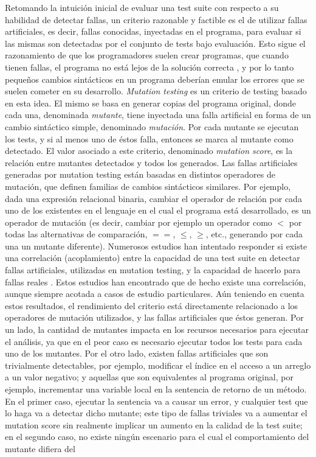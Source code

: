Retomando la intuici\'on inicial de evaluar una test suite con respecto a su habilidad de detectar fallas, un criterio razonable y factible es el de utilizar fallas artificiales, es decir, fallas conocidas, inyectadas en el programa, para evaluar si las mismas son detectadas por el conjunto de tests bajo evaluaci\'on. Esto sigue el razonamiento de que los programadores suelen crear programas, que cuando tienen fallas, el programa no est\'a lejos de la soluci\'on correcta \cite{bibliography.mutation.DeMillo}, y por lo tanto peque\~nos cambios sint\'acticos en un programa deber\'ian emular los errores que se suelen cometer en su desarrollo. \emph{Mutation testing} es un criterio de testing basado en esta idea. El mismo se basa en generar copias del programa original, donde cada una, denominada \emph{mutante}, tiene inyectada una falla artificial en forma de un cambio sint\'actico simple, denominado \emph{mutaci\'on}. Por cada mutante se ejecutan los tests, y si al menos uno de \'estos falla, entonces se marca al mutante como detectado. El valor asociado a este criterio, denominado \emph{mutation score}, es la relaci\'on entre mutantes detectados y todos los generados. Las fallas artificiales generadas por mutation testing est\'an basadas en distintos operadores de mutaci\'on, que definen familias de cambios sint\'acticos similares. Por ejemplo, dada una expresi\'on relacional binaria, cambiar el operador de relaci\'on por cada uno de los existentes en el lenguaje en el cual el programa est\'a desarrollado, es un operador de mutaci\'on (es decir, cambiar por ejemplo un operador como $<$ por todas las alternativas de comparaci\'on, $==$, $\le$, $\ge$, etc., generando por cada una un mutante diferente). Numerosos estudios han intentado responder si existe una correlaci\'on (acoplamiento) entre la capacidad de una test suite en detectar fallas artificiales, utilizadas en mutation testing, y la capacidad de hacerlo para fallas reales \cite{bibliography.mutation.evaluation.coupling.Offutt89, bibliography.mutation.evaluation.coupling.Offutt92, bibliography.mutation.evaluation.HAndrews05, bibliography.mutation.evaluation.valid-substitute}. Estos estudios han encontrado que de hecho existe una correlaci\'on, aunque siempre acotada a casos de estudio particulares. A\'un teniendo en cuenta estos resultados, el rendimiento del criterio est\'a directamente relacionado a los operadores de mutaci\'on utilizados, y las fallas artificiales que \'estos generan. Por un lado, la cantidad de mutantes impacta en los recursos necesarios para ejecutar el an\'alisis, ya que en el peor caso es necesario ejecutar todos los tests para cada uno de los mutantes. Por el otro lado, existen fallas artificiales que son trivialmente detectables, por ejemplo, modificar el \'indice en el acceso a un arreglo a un valor negativo; y aquellas que son equivalentes al programa original, por ejemplo, incrementar una variable local en la sentencia de retorno de un m\'etodo. En el primer caso, ejecutar la sentencia va a causar un error, y cualquier test que lo haga va a detectar dicho mutante; este tipo de fallas triviales va a aumentar el mutation score sin realmente implicar un aumento en la calidad de la test suite; en el segundo caso, no existe ning\'un escenario para el cual el comportamiento del mutante difiera del 